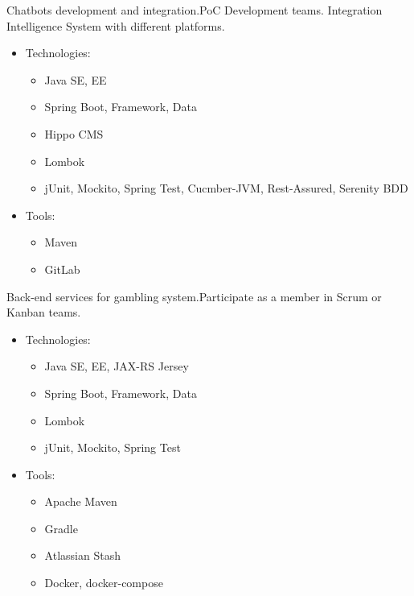 \documentclass[11pt, a4paper]{moderncv}
\begin{document}
{Chatbots development and integration.\newline{}PoC Development teams. Integration Intelligence System with different platforms.
\begin{itemize}
\item Technologies:
\begin{itemize}
\item Java SE, EE
\item Spring Boot, Framework, Data
\item Hippo CMS
\item Lombok
\item jUnit, Mockito, Spring Test, Cucmber-JVM, Rest-Assured, Serenity BDD  
\end{itemize}
\item Tools:
\begin{itemize}
\item Maven
\item GitLab 
\end{itemize}
\end{itemize}}

{Back-end services for gambling system.\newline{}Participate as a member in Scrum or Kanban teams.
\begin{itemize}
\item Technologies:
\begin{itemize}
\item Java SE, EE, JAX-RS Jersey
\item Spring Boot, Framework, Data
\item Lombok 
\item jUnit, Mockito, Spring Test
\end{itemize}
\item Tools:
\begin{itemize}
\item Apache Maven
\item Gradle
\item Atlassian Stash
\item Docker, docker-compose
\end{itemize}
\end{itemize}}
\end{document}
